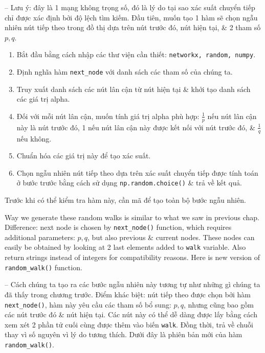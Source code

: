\documentclass{article}
\begin{document}
\begin{itemize}
\begin{itemize}
\begin{itemize}
            -- Lưu ý: đây là 1 mạng không trọng số, đó là lý do tại sao xác suất chuyển tiếp chỉ được xác định bởi độ lệch tìm kiếm. Đầu tiên, muốn tạo 1 hàm sẽ chọn ngẫu nhiên nút tiếp theo trong đồ thị dựa trên nút trước đó, nút hiện tại, \& 2 tham số $p,q$.
            \begin{enumerate}
                \item Bắt đầu bằng cách nhập các thư viện cần thiết: {\tt networkx, random, numpy}.
                \item Định nghĩa hàm \verb|next_node| với danh sách các tham số của chúng ta.
                \item Truy xuất danh sách các nút lân cận từ nút hiện tại \& khởi tạo danh sách các giá trị alpha.
                \item Đối với mỗi nút lân cận, muốn tính giá trị alpha phù hợp: $\frac{1}{p}$ nếu nút lân cận này là nút trước đó, 1 nếu nút lân cận này được kết nối với nút trước đó, \& $\frac{1}{q}$ nếu không.
                \item Chuẩn hóa các giá trị này để tạo xác suất.

                \item Chọn ngẫu nhiên nút tiếp theo dựa trên xác suất chuyển tiếp được tính toán ở bước trước bằng cách sử dụng {\tt np.random.choice()} \& trả về kết quả.
            \end{enumerate}
            Trước khi có thể kiểm tra hàm này, cần mã để tạo toàn bộ bước ngẫu nhiên.

            Way we generate these random walks is similar to what we saw in previous chap. Difference: next node is chosen by \verb|next_node()| function, which requires additional parameters: $p,q$, but also previous \& current nodes. These nodes can easily be obtained by looking at 2 last elements added to {\tt walk} variable. Also return strings instead of integers for compatibility reasons. Here is new version of \verb|random_walk()| function.

            -- Cách chúng ta tạo ra các bước ngẫu nhiên này tương tự như những gì chúng ta đã thấy trong chương trước. Điểm khác biệt: nút tiếp theo được chọn bởi hàm \verb|next_node()|, hàm này yêu cầu các tham số bổ sung: $p,q$, nhưng cũng bao gồm các nút trước đó \& nút hiện tại. Các nút này có thể dễ dàng được lấy bằng cách xem xét 2 phần tử cuối cùng được thêm vào biến {\tt walk}. Đồng thời, trả về chuỗi thay vì số nguyên vì lý do tương thích. Dưới đây là phiên bản mới của hàm \verb|random_walk()|.


\end{itemize}
\end{itemize}
\end{itemize}
\end{document}
